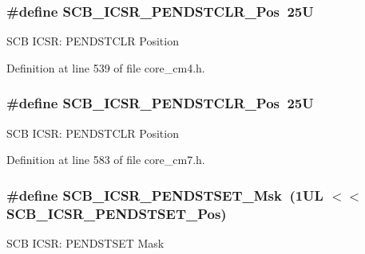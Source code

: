 \subsubsection[{\texorpdfstring{S\+C\+B\+\_\+\+I\+C\+S\+R\+\_\+\+P\+E\+N\+D\+S\+T\+C\+L\+R\+\_\+\+Pos}{SCB_ICSR_PENDSTCLR_Pos}}]{\setlength{\rightskip}{0pt plus 5cm}\#define S\+C\+B\+\_\+\+I\+C\+S\+R\+\_\+\+P\+E\+N\+D\+S\+T\+C\+L\+R\+\_\+\+Pos~25U}\hypertarget{group___c_m_s_i_s___s_c_b_gadbe25e4b333ece1341beb1a740168fdc}{}\label{group___c_m_s_i_s___s_c_b_gadbe25e4b333ece1341beb1a740168fdc}
S\+CB I\+C\+SR\+: P\+E\+N\+D\+S\+T\+C\+LR Position 

Definition at line 539 of file core\+\_\+cm4.\+h.

\subsubsection[{\texorpdfstring{S\+C\+B\+\_\+\+I\+C\+S\+R\+\_\+\+P\+E\+N\+D\+S\+T\+C\+L\+R\+\_\+\+Pos}{SCB_ICSR_PENDSTCLR_Pos}}]{\setlength{\rightskip}{0pt plus 5cm}\#define S\+C\+B\+\_\+\+I\+C\+S\+R\+\_\+\+P\+E\+N\+D\+S\+T\+C\+L\+R\+\_\+\+Pos~25U}\hypertarget{group___c_m_s_i_s___s_c_b_gadbe25e4b333ece1341beb1a740168fdc}{}\label{group___c_m_s_i_s___s_c_b_gadbe25e4b333ece1341beb1a740168fdc}
S\+CB I\+C\+SR\+: P\+E\+N\+D\+S\+T\+C\+LR Position 

Definition at line 583 of file core\+\_\+cm7.\+h.

\subsubsection[{\texorpdfstring{S\+C\+B\+\_\+\+I\+C\+S\+R\+\_\+\+P\+E\+N\+D\+S\+T\+S\+E\+T\+\_\+\+Msk}{SCB_ICSR_PENDSTSET_Msk}}]{\setlength{\rightskip}{0pt plus 5cm}\#define S\+C\+B\+\_\+\+I\+C\+S\+R\+\_\+\+P\+E\+N\+D\+S\+T\+S\+E\+T\+\_\+\+Msk~(1\+U\+L $<$$<$ S\+C\+B\+\_\+\+I\+C\+S\+R\+\_\+\+P\+E\+N\+D\+S\+T\+S\+E\+T\+\_\+\+Pos)}\hypertarget{group___c_m_s_i_s___s_c_b_ga7325b61ea0ec323ef2d5c893b112e546}{}\label{group___c_m_s_i_s___s_c_b_ga7325b61ea0ec323ef2d5c893b112e546}
S\+CB I\+C\+SR\+: P\+E\+N\+D\+S\+T\+S\+ET Mask 

